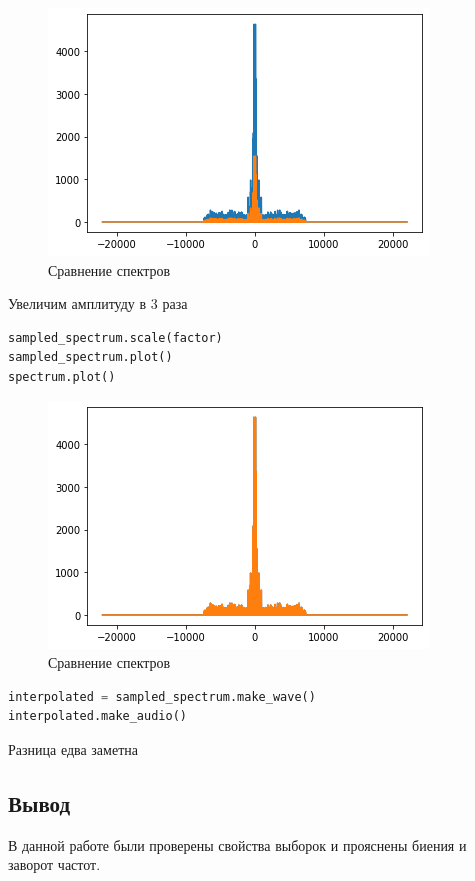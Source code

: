 \begin{figure}[H]
	\begin{center}
		\includegraphics[scale=1]{fig/lab11/lab11_06.png}
		\caption{Сравнение спектров}
	\end{center}
\end{figure}

Увеличим амплитуду в 3 раза

\begin{lstlisting}[language=Python]
sampled_spectrum.scale(factor)
sampled_spectrum.plot()
spectrum.plot()
\end{lstlisting}

\begin{figure}[H]
	\begin{center}
		\includegraphics[scale=1]{fig/lab11/lab11_07.png}
		\caption{Сравнение спектров}
	\end{center}
\end{figure}

\begin{lstlisting}[language=Python]
interpolated = sampled_spectrum.make_wave()
interpolated.make_audio()
\end{lstlisting}

Разница едва заметна


\subsection{Вывод}

В данной работе были проверены свойства выборок и прояснены биения и заворот частот.